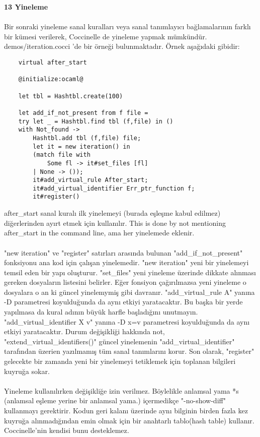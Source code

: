 \documentclass[a4paper,20pt, right=2cm]{article}
\begin{document}
\textbf{13 Yineleme}\\
\\
Bir sonraki yineleme sanal kuralları veya sanal tanımlayıcı bağlamalarının farklı bir kümesi verilerek, Coccinelle de yineleme yapmak mümkündür. demos/iteration.cocci 'de bir örneği bulunmaktadır. Örnek aşağıdaki gibidir:
\begin{lstlisting}
	virtual after_start

	@initialize:ocaml@

	let tbl = Hashtbl.create(100)

	let add_if_not_present from f file =
	try let _ = Hashtbl.find tbl (f,file) in ()
	with Not_found ->
	    Hashtbl.add tbl (f,file) file;
	    let it = new iteration() in
	    (match file with
	        Some fl -> it#set_files [fl]
	    | None -> ());
	    it#add_virtual_rule After_start;
	    it#add_virtual_identifier Err_ptr_function f;
	    it#register()
\end{lstlisting}
after\_start sanal kuralı ilk yinelemeyi (burada eşleşme kabul edilmez) diğerlerinden ayırt etmek için kullanılır. This is done by not mentioning after\_start in the command line, ama her yinelemede eklenir.\\
\\
"new iteration" ve "register" satırları arasında bulunan "add\_if\_not\_present" fonksiyonu ana kod için çalışan yinelemedir. "new iteration" yeni bir yinelemeyi temsil eden bir yapı oluşturur. "set\_files" yeni yineleme üzerinde dikkate alınması gereken dosyaların listesini belirler. Eğer fonsiyon çağırılmazsa yeni yineleme o dosyalara o an ki güncel yinelemymiş gibi davranır. "add\_virtual\_rule A" yanına -D parametresi koyulduğunda da aynı etkiyi yaratacaktır. Bu başka bir yerde yapılmasa da kural adının büyük harfle başladığını unutmayın. "add\_virtual\_identifier X v" yanına -D x=v parametresi koyulduğunda da aynı etkiyi yaratacaktır. Durum değişikliği hakkında not, "extend\_virtual\_identifiers()" güncel yinelemenin "add\_virtual\_identifier" tarafından üzerien yazılmamış tüm sanal tanımlarını korur. Son olarak, "register" gelecekte bir zamanda yeni bir yinelemeyi tetiklemek için toplanan bilgileri kuyruğa sokar.\\
\\
Yineleme kullanılırken değişikliğe izin verilmez. Böylelikle anlamsal yama *s (anlamsal eşleme yerine bir anlamsal yama.) içermedikçe "-no-show-diff" kullanmayı gerektirir. Kodun geri kalanı üzerinde aynı bilginin birden fazla kez kuyruğa alınmadığından emin olmak için bir anahtarlı tablo(hash table) kullanır. Coccinelle'nin kendisi bunu desteklemez.\\
\end{document}
